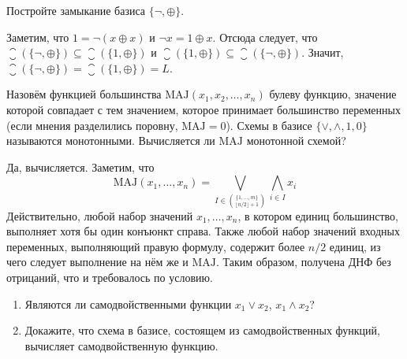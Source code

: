 \begin{Exercise}[counter=SecExercise, label={exercise:boolean:linear_closure}]
    \noindent
    Постройте замыкание базиса $ \{\neg, \oplus\} $.
\end{Exercise}

\begin{Answer}
    \noindent
    Заметим, что $ 1 = \neg (x \oplus x) $ и $ \neg x = 1 \oplus x $.
    Отсюда следует, что $ \closure(\{\neg, \oplus\}) \subseteq \closure(\{1, \oplus\}) $ и $ \closure(\{1, \oplus\}) \subseteq \closure(\{\neg, \oplus\}) $.
    Значит, $ \closure(\{\neg, \oplus\}) = \closure(\{1, \oplus\}) = L $.
\end{Answer}

\begin{Exercise}[counter=SecExercise, label={exercise:boolean:monotonous_and_MAJ}]
    \noindent
    Назовём функцией большинства $ \text{MAJ}(x_1, x_2,\ldots , x_n) $ булеву функцию,
    значение которой совпадает с тем значением,
    которое принимает большинство переменных (если мнения разделились поровну, $ \text{MAJ} = 0 $).
    Схемы в базисе $ \{\vee, \wedge, 1, 0 \} $ называются монотонными.
    Вычисляется ли $ \text{MAJ} $ монотонной схемой?
\end{Exercise}

\begin{Answer}
    \noindent
    Да, вычисляется.
    Заметим, что
    \[
        \text{MAJ}(x_1, \ldots, x_n) = \bigvee_{I \in \binom{\{1, \ldots, m\}}{\lfloor n/2 \rfloor + 1}} \bigwedge_{i \in I} x_i
    \]
    Действительно, любой набор значений $ x_1, \ldots, x_n $, в котором единиц большинство, выполняет хотя бы один конъюнкт справа.
    Также любой набор значений входных переменных, выполняющий правую формулу, содержит более $ n/2 $ единиц,
    из чего следует выполнение на нём же и $ \text{MAJ} $.
    Таким образом, получена ДНФ без отрицаний, что и требовалось по условию.
\end{Answer}


\begin{Exercise}[counter=SecExercise, label={exercise:boolean:self_dual}]
    \noindent
    \begin{enumerate}[label=\textbf{\alph*)}]
        \item
            Являются ли самодвойственными функции $ x_1 \vee x_2 $, $ x_1 \wedge x_2 $?
        \item
            Докажите, что схема в базисе, состоящем из самодвойственных функций,
            вычисляет самодвойственную функцию.
    \end{enumerate}
\end{Exercise}

